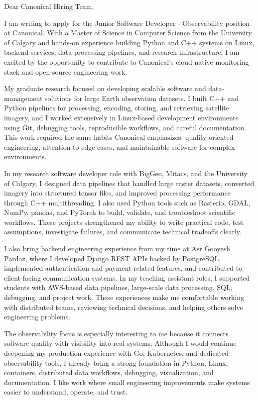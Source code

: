 \documentclass[11pt]{letter}
\begin{document}
\begin{letter}{}

\opening{Dear Canonical Hiring Team,}

I am writing to apply for the Junior Software Developer - Observability position at Canonical. With a Master of Science in Computer Science from the University of Calgary and hands-on experience building Python and C++ systems on Linux, backend services, data-processing pipelines, and research infrastructure, I am excited by the opportunity to contribute to Canonical's cloud-native monitoring stack and open-source engineering work.

My graduate research focused on developing scalable software and data-management solutions for large Earth observation datasets. I built C++ and Python pipelines for processing, encoding, storing, and retrieving satellite imagery, and I worked extensively in Linux-based development environments using Git, debugging tools, reproducible workflows, and careful documentation. This work required the same habits Canonical emphasizes: quality-oriented engineering, attention to edge cases, and maintainable software for complex environments.

In my research software developer role with BigGeo, Mitacs, and the University of Calgary, I designed data pipelines that handled large raster datasets, converted imagery into structured tensor files, and improved processing performance through C++ multithreading. I also used Python tools such as Rasterio, GDAL, NumPy, pandas, and PyTorch to build, validate, and troubleshoot scientific workflows. These projects strengthened my ability to write practical code, test assumptions, investigate failures, and communicate technical tradeoffs clearly.

I also bring backend engineering experience from my time at Asr Gooyesh Pardaz, where I developed Django REST APIs backed by PostgreSQL, implemented authentication and payment-related features, and contributed to client-facing communication systems. In my teaching assistant roles, I supported students with AWS-based data pipelines, large-scale data processing, SQL, debugging, and project work. These experiences make me comfortable working with distributed teams, reviewing technical decisions, and helping others solve engineering problems.

The observability focus is especially interesting to me because it connects software quality with visibility into real systems. Although I would continue deepening my production experience with Go, Kubernetes, and dedicated observability tools, I already bring a strong foundation in Python, Linux, containers, distributed data workflows, debugging, visualization, and documentation. I like work where small engineering improvements make systems easier to understand, operate, and trust.


\end{letter}
\end{document}
